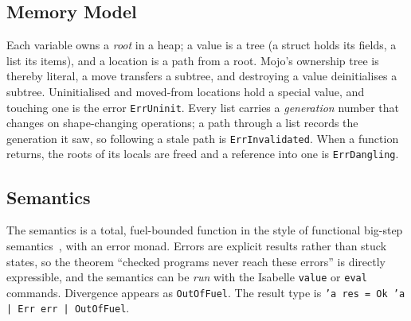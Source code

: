\documentclass[11pt,a4paper]{article}
\newcommand{\code}[1]{\texttt{#1}}
\begin{document}
\subsection{Memory Model}
Each variable owns a \emph{root} in a heap; a value is a tree (a struct holds its
fields, a list its items), and a location is a path from a root. Mojo's ownership
tree is thereby literal, a move transfers a subtree, and destroying a value
deinitialises a subtree. Uninitialised and moved-from locations hold a special
value, and touching one is the error \code{ErrUninit}. Every list carries a
\emph{generation} number that changes on shape-changing operations; a path
through a list records the generation it saw, so following a stale path is
\code{ErrInvalidated}. When a function returns, the roots of its locals are freed
and a reference into one is \code{ErrDangling}.

\subsection{Semantics}
The semantics is a total, fuel-bounded function in the style of functional
big-step semantics~\cite{owens-fbs}, with an error monad. Errors are explicit
results rather than stuck states, so the theorem ``checked programs never reach
these errors'' is directly expressible, and the semantics can be \emph{run} with
the Isabelle \code{value} or \code{eval} commands. 
Divergence appears as \code{OutOfFuel}. The
result type is \code{'a res = Ok 'a | Err err | OutOfFuel}.
\end{document}
